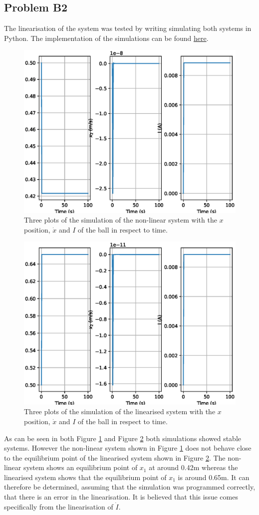 \subsection*{Problem B2}

    The linearisation of the system was tested by writing simulating both systems in Python. The implementation of the simulations can be found \href{https://github.com/drlim2u/ELE2024-Control-Coursework/blob/4dc7e6f918fce68ee3aef799fe1dba15ea789481/PartB.py#L44}{here}.

    \begin{figure}[H]
        \centering
        \includegraphics[width=0.6\linewidth]{figures/problem_b2_a.eps}
        \caption{Three plots of the simulation of the non-linear system with the \(x\) position, \(\dot{x}\) and \(I\) of the ball in respect to time.}
        \label{fig:problem_b2_a}
    \end{figure}
    
    \begin{figure}[H]
        \centering
        \includegraphics[width=0.6\linewidth]{figures/problem_b2_b.eps}
        \caption{Three plots of the simulation of the linearised system with the \(x\) position, \(\dot{x}\) and \(I\) of the ball in respect to time.}
        \label{fig:problem_b2_b}
    \end{figure}
    
    As can be seen in both Figure \ref{fig:problem_b2_a} and Figure \ref{fig:problem_b2_b} both simulations showed stable systems. However the non-linear system shown in Figure \ref{fig:problem_b2_a} does not behave close to the equilibrium point of the linearised system shown in Figure \ref{fig:problem_b2_b}. The non-linear system shows an equilibrium point of \(x_1\) at around 0.42m whereas the linearised system shows that the equilibrium point of \(x_1\) is around 0.65m. It can therefore be determined, assuming that the simulation was programmed correctly, that there is an error in the linearisation. It is believed that this issue comes specifically from the linearisation of \(\dot{I}\).

